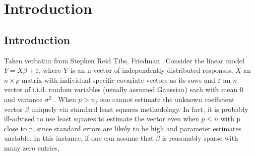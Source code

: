 \chapter{Introduction\label{ch:introduction}}

\section{Introduction}
Taken verbatim from Stephen Reid Tibs, Friedman~\cite{reid2016study}
Consider the linear model
$Y = X\beta + \varepsilon$,
where Y is an n-vector of independently distributed responses, $X$ an $n \times p$ matrix
with individual specific covariate vectors as its rows and $\varepsilon$ an $n$-vector of
i.i.d. random variables (usually assumed Gaussian) each with mean 0 and variance $\sigma^2$
.
When $p > n$, one cannot estimate the unknown coefficient vector $\beta$ uniquely
via standard least squares methodology. In fact, it is probably ill-advised to use
least squares to estimate the vector even when $p \leq n$ with p close to n, since
standard errors are likely to be high and parameter estimates unstable. In this
instance, if one can assume that $\beta$ is reasonably sparse with many zero entries,